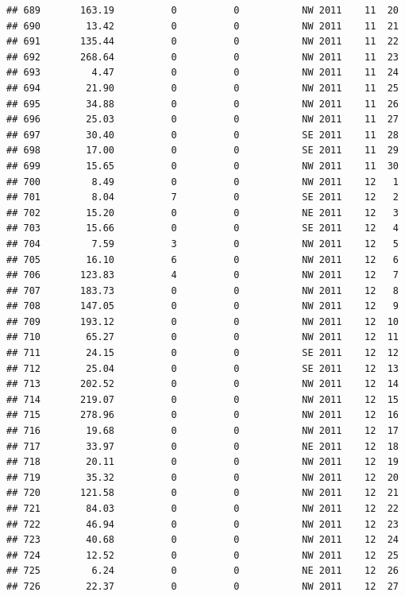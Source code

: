 \documentclass[
]{article}
\begin{document}
\begin{verbatim}
## 689       163.19          0          0           NW 2011    11  20
## 690        13.42          0          0           NW 2011    11  21
## 691       135.44          0          0           NW 2011    11  22
## 692       268.64          0          0           NW 2011    11  23
## 693         4.47          0          0           NW 2011    11  24
## 694        21.90          0          0           NW 2011    11  25
## 695        34.88          0          0           NW 2011    11  26
## 696        25.03          0          0           NW 2011    11  27
## 697        30.40          0          0           SE 2011    11  28
## 698        17.00          0          0           SE 2011    11  29
## 699        15.65          0          0           NW 2011    11  30
## 700         8.49          0          0           NW 2011    12   1
## 701         8.04          7          0           SE 2011    12   2
## 702        15.20          0          0           NE 2011    12   3
## 703        15.66          0          0           SE 2011    12   4
## 704         7.59          3          0           NW 2011    12   5
## 705        16.10          6          0           NW 2011    12   6
## 706       123.83          4          0           NW 2011    12   7
## 707       183.73          0          0           NW 2011    12   8
## 708       147.05          0          0           NW 2011    12   9
## 709       193.12          0          0           NW 2011    12  10
## 710        65.27          0          0           NW 2011    12  11
## 711        24.15          0          0           SE 2011    12  12
## 712        25.04          0          0           SE 2011    12  13
## 713       202.52          0          0           NW 2011    12  14
## 714       219.07          0          0           NW 2011    12  15
## 715       278.96          0          0           NW 2011    12  16
## 716        19.68          0          0           NW 2011    12  17
## 717        33.97          0          0           NE 2011    12  18
## 718        20.11          0          0           NW 2011    12  19
## 719        35.32          0          0           NW 2011    12  20
## 720       121.58          0          0           NW 2011    12  21
## 721        84.03          0          0           NW 2011    12  22
## 722        46.94          0          0           NW 2011    12  23
## 723        40.68          0          0           NW 2011    12  24
## 724        12.52          0          0           NW 2011    12  25
## 725         6.24          0          0           NE 2011    12  26
## 726        22.37          0          0           NW 2011    12  27

\end{verbatim}
\end{document}
